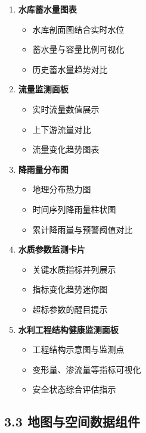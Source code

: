 \begin{enumerate}
\def\labelenumi{\arabic{enumi}.}
\tightlist
\item
  \textbf{水库蓄水量图表}

  \begin{itemize}
  \tightlist
  \item
    水库剖面图结合实时水位
  \item
    蓄水量与容量比例可视化
  \item
    历史蓄水量趋势对比
  \end{itemize}
\item
  \textbf{流量监测面板}

  \begin{itemize}
  \tightlist
  \item
    实时流量数值展示
  \item
    上下游流量对比
  \item
    流量变化趋势图表
  \end{itemize}
\item
  \textbf{降雨量分布图}

  \begin{itemize}
  \tightlist
  \item
    地理分布热力图
  \item
    时间序列降雨量柱状图
  \item
    累计降雨量与预警阈值对比
  \end{itemize}
\item
  \textbf{水质参数监测卡片}

  \begin{itemize}
  \tightlist
  \item
    关键水质指标并列展示
  \item
    指标变化趋势迷你图
  \item
    超标参数的醒目提示
  \end{itemize}
\item
  \textbf{水利工程结构健康监测面板}

  \begin{itemize}
  \tightlist
  \item
    工程结构示意图与监测点
  \item
    变形量、渗流量等指标可视化
  \item
    安全状态综合评估指示
  \end{itemize}
\end{enumerate}

\subsection{3.3
地图与空间数据组件}\label{ux5730ux56feux4e0eux7a7aux95f4ux6570ux636eux7ec4ux4ef6}

